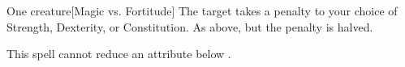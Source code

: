 \begin{spellheader}
    \spellrng{\rngmed}
    \spelldur{\durshort}
\end{spellheader}
\begin{spelleffects}
    \begin{spelltarget}{One creature}[Magic vs. Fortitude]
        \spellsuccess The target takes a  penalty to your choice of Strength, Dexterity, or Constitution.
        \spellfailure As above, but the penalty is halved.
    \end{spelltarget}
\end{spelleffects}
\begin{spellfooter}
    \spellnotes This spell cannot reduce an attribute below .
\end{spellfooter}

